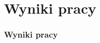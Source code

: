 \documentclass{beamer}
\begin{document}
\section{Wyniki pracy}

\begin{frame}
	\frametitle{Wyniki pracy}
\end{frame}






\end{document}
